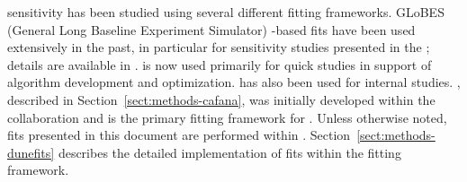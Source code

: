  sensitivity has been studied using several different fitting frameworks. GLoBES (General Long Baseline Experiment Simulator)\cite{Huber:2004ka,Huber:2007ji} %
-based fits have been used extensively in the past, in particular for sensitivity studies presented in the  ; details are available in \cite{Acciarri:2015uup,Alion:2016uaj,Bass:2014vta}.  is now used primarily for quick studies in support of algorithm development and optimization. \cite{valorweb} has also been used for internal studies. , described in Section~\ref{sect:methods-cafana}, was initially developed within the  collaboration and is the primary fitting framework for . Unless otherwise noted, fits presented in this document are performed within . Section~\ref{sect:methods-dunefits} describes the detailed implementation of  fits within the  fitting framework.

